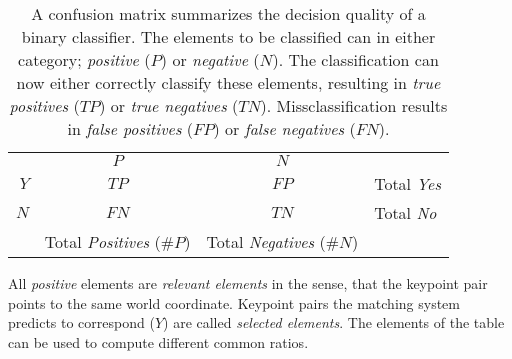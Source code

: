 \begin{table}
\bgroup%
\def\arraystretch{1.5}%
\setlength\tabcolsep{0.5em}
\begin{tabular}{r|c|c|l}
    \multicolumn{1}{r}{} &
    \multicolumn{1}{c}{$P$} &
    \multicolumn{1}{c}{$N$} &
    \multicolumn{1}{l}{} \\
  \cline{2-3}
  $Y$ & $TP$  & $FP$ & Total \emph{Yes} \\
  \cline{2-3}
  $N$ & $FN$  & $TN$ & Total \emph{No} \\
  \cline{2-3}
    \multicolumn{1}{r}{} &
    \multicolumn{1}{c}{Total \emph{Positives} ($\#P$)} &
    \multicolumn{1}{c}{Total \emph{Negatives} ($\#N$)}
\end{tabular}
\egroup%
\caption[Definition of the Confusion Matrix]{A confusion matrix summarizes the decision quality of a binary classifier. The elements to be classified can in either category; \emph{positive} ($P$) or \emph{negative} ($N$). The classification can now either correctly classify these elements, resulting in \emph{true positives} ($TP$) or \emph{true negatives} ($TN$). Missclassification results in \emph{false positives} ($FP$) or \emph{false negatives} ($FN$).}\label{tab:def_confusion_matrix}
\end{table}

All \emph{positive} elements are \emph{relevant elements} in the sense, that the keypoint pair points to the same world coordinate.
Keypoint pairs the matching system predicts to correspond ($Y$) are called \emph{selected elements}.
The elements of the table can be used to compute different common ratios.

